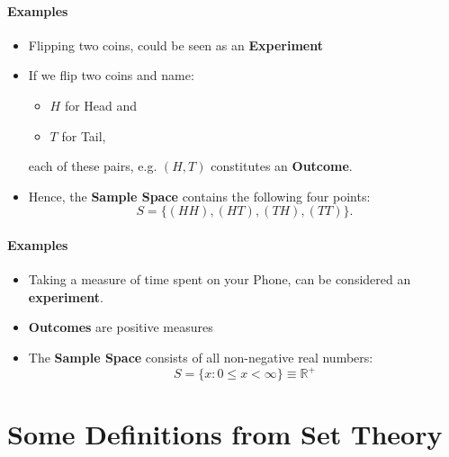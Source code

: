 \documentclass[notes=show]{beamer}\usepackage[]{graphicx}\usepackage[]{color}
\begin{document}
\begin{frame}{\secname}
\framesubtitle{Examples}
  \begin{example}
  \begin{itemize}
  \item Flipping two coins, could be seen as an \textbf{Experiment}

  \pause

  \item If we flip two coins and name:
  \begin{itemize}
  \item $H$ for Head and
  \item $T$ for Tail,
  \end{itemize}
  each of these pairs, e.g. $(H,T)$ constitutes an \textbf{Outcome}.

  \pause

  \item Hence, the \textbf{Sample Space} contains the following four points:
  $$ S = \{ (HH),(HT),(TH),(TT)  \}.$$
  \end{itemize}
  \end{example}
\end{frame}

\begin{frame}{\secname}
\framesubtitle{Examples}
  \begin{example}
  \begin{itemize}
  \item Taking a measure of time spent on your Phone, can be considered an \textbf{experiment}.

  \item \textbf{Outcomes} are positive measures


  \item The \textbf{Sample Space} consists of all non-negative real numbers:
  $$
  S = \{x: 0 \leq x < \infty \} \equiv \mathbb{R}^+
  $$
  \end{itemize}
  \end{example}
\end{frame}

\section{Some Definitions from Set Theory}
\end{document}
